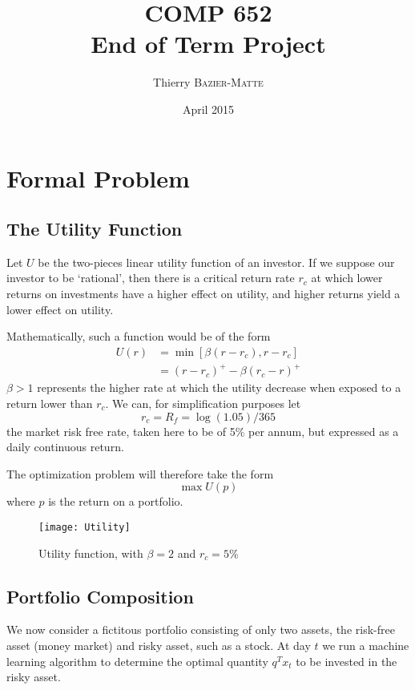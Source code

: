 \documentclass[11pt,fleqn]{article}
\title{COMP 652 \\ End of Term Project}
\author{Thierry \textsc{Bazier-Matte}}
\date{April 2015}
\begin{document}
\maketitle

\section{Formal Problem}

\subsection{The Utility Function}

Let $U$ be the two-pieces linear utility function of an investor. If we suppose our investor
to be `rational', then there is a critical return rate $r_c$ at which lower returns on
investments have a higher effect on utility, and higher returns yield a lower effect on
utility. 

Mathematically, such a function would be of the form 
\begin{align*}
  U(r) &= \min[\beta(r-r_c), r-r_c]\\
       &= (r-r_c)^+ - \beta(r_c - r)^+
\end{align*}
$\beta>1$ represents the higher rate at which the utility decrease when exposed to a
return lower than $r_c$. We can, for simplification purposes let
\begin{equation*}
  r_c = R_f = \log(1.05)/365
\end{equation*}
the market risk free rate, taken here to be of 5\% per annum, but expressed as a daily
continuous return.

The optimization problem will therefore take the form
\begin{equation*}
  \max U(p)
\end{equation*}
where $p$ is the return on a portfolio.

\begin{figure}
  \centering
  \texttt{[image: Utility]}
  \caption{Utility function, with $\beta=2$ and $r_c=5\%$}
  \label{fig:utility}
\end{figure}

\subsection{Portfolio Composition}

We now consider a fictitous portfolio consisting of only two assets, the risk-free asset
(money market) and risky asset, such as a stock. At day $t$ we run a machine learning
algorithm to determine the optimal quantity $q^Tx_t$ to be invested in the risky asset. 
\end{document}
